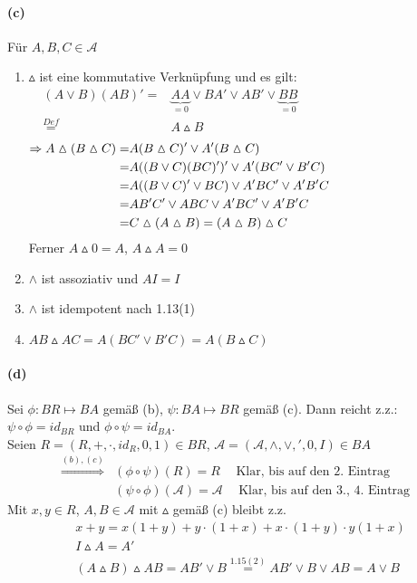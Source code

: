 \documentclass[10pt, a4paper]{article}
\begin{document}
\paragraph*{(c)}
Für $A,B,C \in \mathcal{A}$
\begin{enumerate}
	\item $\vartriangle$ ist eine kommutative Verknüpfung und es gilt:
	\begin{align*}
	(A\vee B)(AB)'=&\underbrace{AA}_{=0} \vee BA' \vee AB' \vee \underbrace{BB}_{=0}	\hspace{2in}\\
	\stackrel{Def}{=} & A\vartriangle B
	\end{align*}
	\begin{align*}
		\Rightarrow A \vartriangle (B \vartriangle C) =& A(B \vartriangle C)'\vee A'(B\vartriangle C)	\hspace{2.5in}\\
		=&A((B\vee C)(BC)')'\vee A'(BC'\vee B'C)	\\
		=&A((B\vee C)'\vee BC)\vee A'BC'\vee A'B'C	\\
		=&AB'C'\vee ABC\vee A'BC'\vee A'B'C	\\
		=&C\vartriangle (A\vartriangle B)=(A\vartriangle B)\vartriangle C	\\
	\end{align*}
	Ferner $A\vartriangle 0 = A$, $A\vartriangle A=0$
	\item $\wedge$ ist assoziativ und $AI=I$
	\item $\wedge$ ist idempotent nach 1.13(1)
	\item $AB\vartriangle AC=A(BC'\vee B'C)=A(B\vartriangle C)$
\end{enumerate}

\paragraph*{(d)}
Sei $\phi : BR \mapsto BA$ gemäß (b), $\psi : BA \mapsto BR$ gemäß (c). Dann reicht z.z.:
$\psi \circ \phi = id_{BR}$ und $\phi \circ \psi = id_{BA}$.	\\
Seien $R=(R,+,\cdot , id_R,0,1)\in BR$, $\boxed{\mathcal{A}}=(\mathcal{A},\wedge ,\vee ,',0,I)\in BA$
\begin{align*}
	\stackrel{(b),(c)}{\Rightarrow} &(\phi \circ \psi)(R)=R \hspace{15pt} \text{Klar, bis auf den 2. Eintrag}	\\
	&(\psi \circ \phi)(\boxed{\mathcal{A}})=\boxed{\mathcal{A}} \hspace{15pt} \text{Klar, bis auf den 3., 4. Eintrag}
\end{align*}
Mit $x,y\in R$, $A,B\in \boxed{\mathcal{A}}$ mit $\vartriangle$ gemäß (c) bleibt z.z.
\begin{align*}
&x+y=x(1+y)+y\cdot (1+x)+x\cdot (1+y)\cdot y(1+x)	\\
&I\vartriangle A=A'	\\
&(A\vartriangle B)\vartriangle AB=AB'\vee B\stackrel{1.15(2)}{=}AB'\vee B\vee AB=A\vee B
\end{align*}
\end{document}
